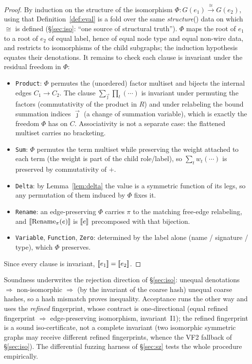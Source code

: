 \documentclass[sigplan,10pt,review]{acmart}
\begin{document}
\begin{proof}
By induction on the structure of the isomorphism
$\Phi:G(e_1)\xrightarrow{\ \cong\ }G(e_2)$, using that
Definition~\ref{def:eval} is a fold over the same
\textit{structure}() data on which $\cong$ is defined
(\S\ref{sec:iso}: ``one source of structural truth''). $\Phi$ maps the
root of $e_1$ to a root of $e_2$ of equal label, hence of equal node
type and equal non-wire data, and restricts to isomorphisms of the
child subgraphs; the induction hypothesis equates their denotations.
It remains to check each clause is invariant under the residual freedom
in $\Phi$:
\begin{itemize}
\item \texttt{Product}: $\Phi$ permutes the (unordered) factor multiset
  and bijects the internal edges $C_1\to C_2$. The clause
  $\sum_{\vec\jmath}\prod_t(\cdots)$ is invariant under permuting the
  factors (commutativity of the product in $R$) and under relabeling the
  bound summation indices $\vec\jmath$ (a change of summation variable),
  which is exactly the freedom $\Phi$ has on $C$. Associativity is not a
  separate case: the flattened multiset carries no bracketing.
\item \texttt{Sum}: $\Phi$ permutes the term multiset while preserving
  the weight attached to each term (the weight is part of the child
  role/label), so $\sum_t w_t(\cdots)$ is preserved by commutativity of
  $+$.
\item \texttt{Delta}: by Lemma~\ref{lem:delta} the value is a symmetric
  function of its legs, so any permutation of them induced by $\Phi$
  fixes it.
\item \texttt{Rename}: an edge-preserving $\Phi$ carries $\pi$ to the
  matching free-edge relabeling, and $\left[\!\left[\mathrm{Rename}_\pi(e)\right]\!\right]$ is
  $\left[\!\left[e\right]\!\right]$ precomposed with that bijection.
\item \texttt{Variable}, \texttt{Function}, \texttt{Zero}: determined by
  the label alone (name / signature / type), which $\Phi$ preserves.
\end{itemize}
Since every clause is invariant, $\left[\!\left[e_1\right]\!\right]=\left[\!\left[e_2\right]\!\right]$.
\end{proof}

\begin{remark}
Soundness underwrites the rejection direction of \S\ref{sec:iso}: unequal
denotations $\Rightarrow$ non-isomorphic $\Rightarrow$ (by the invariant
of the coarse hash) unequal coarse hashes, so a hash mismatch proves
inequality. Acceptance runs the other way and uses the \emph{refined}
fingerprint, whose contract is one-directional (equal refined fingerprint
$\Rightarrow$ edge-preserving isomorphism, invariant~I1); the refined
fingerprint is a sound iso-certificate, not a complete invariant (two
isomorphic symmetric graphs may receive different refined fingerprints,
whence the VF2 fallback of \S\ref{sec:iso}). The differential fuzzing
harness of \S\ref{sec:sz} tests the whole procedure empirically.
\end{remark}
\end{document}
